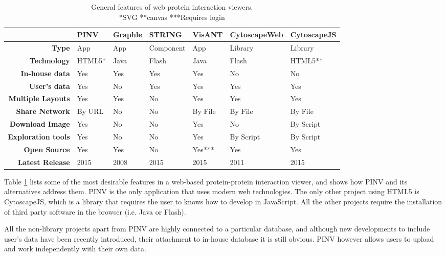 \begin{table}[!ht]
\centering
        \begin{tabular}{| r | l | l | l | l | l | l |}
\hline \rowcolor{table_header}
 & \textbf{PINV} & \textbf{Graphle} & \textbf{STRING} & \textbf{VisANT} & \textbf{CytoscapeWeb} & \textbf{CytoscapeJS}\\
\hline \rowcolor{row_odd}
\textbf{Type} & App & App & Component & App & Library & Library\\
\rowcolor{row_even}
\textbf{Technology} & HTML5* & Java & Flash & Java & Flash & HTML5**\\
\rowcolor{row_odd}
\textbf{In-house data} & Yes & Yes & Yes & Yes & No & No\\
\rowcolor{row_even}
\textbf{User's data} & Yes & No & Yes & Yes & Yes & Yes\\
\rowcolor{row_odd}
\textbf{Multiple Layouts} & Yes & Yes & No & Yes & Yes & Yes\\
\rowcolor{row_even}
\textbf{Share Network} & By URL & No & No & By File & By File & By File\\
\rowcolor{row_odd}
\textbf{Download Image} & Yes & No & No & Yes & No & By Script\\
\rowcolor{row_even}
\textbf{Exploration tools} & Yes & No & No & Yes & By Script & By Script\\
\rowcolor{row_odd}
\textbf{Open Source} & Yes & Yes & No & Yes*** & Yes & Yes\\
\rowcolor{row_even}
\textbf{Latest Release} & 2015 & 2008 & 2015 & 2015 & 2011 & 2015\\
\hline 
        \end{tabular}
        \caption{General features of web protein interaction viewers. \\ *SVG **canvas ***Requires login}
        \label{tab:int_viewers}
\end{table}

Table \ref{tab:int_viewers} lists some of the most desirable features in a web-based protein-protein interaction viewer, and shows how PINV and its alternatives address them. PINV is the only application that uses modern web technologies. The only other project using HTML5 is CytoscapeJS, which is a library that requires the user to knows how to develop in JavaScript. All the other projects require the installation of third party software in the browser (i.e. Java or Flash).

All the non-library projects apart from PINV are highly connected to a particular database, and although new developments to include user's data have been recently introduced, their attachment to in-house database it is still obvious. PINV however allows users to upload and work independently with their own data.

